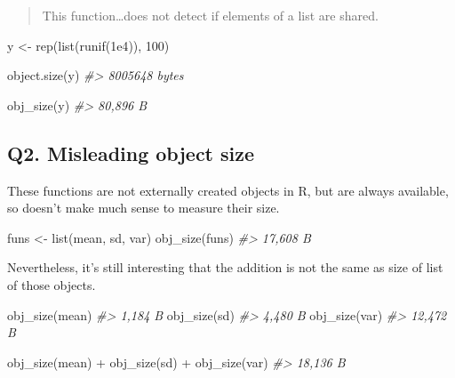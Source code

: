 \documentclass[
]{book}
\newenvironment{Shaded}{\begin{snugshade}}{\end{snugshade}}
\newcommand{\CommentTok}[1]{\textcolor[rgb]{0.56,0.35,0.01}{\textit{#1}}}
\newcommand{\DecValTok}[1]{\textcolor[rgb]{0.00,0.00,0.81}{#1}}
\newcommand{\FloatTok}[1]{\textcolor[rgb]{0.00,0.00,0.81}{#1}}
\newcommand{\FunctionTok}[1]{\textcolor[rgb]{0.00,0.00,0.00}{#1}}
\newcommand{\NormalTok}[1]{#1}
\newcommand{\OtherTok}[1]{\textcolor[rgb]{0.56,0.35,0.01}{#1}}
\newcommand{\SpecialCharTok}[1]{\textcolor[rgb]{0.00,0.00,0.00}{#1}}
\begin{document}
\begin{quote}
This function\ldots does not detect if elements of a list are shared.
\end{quote}

\begin{Shaded}
\begin{Highlighting}[]
\NormalTok{y }\OtherTok{\textless{}{-}} \FunctionTok{rep}\NormalTok{(}\FunctionTok{list}\NormalTok{(}\FunctionTok{runif}\NormalTok{(}\FloatTok{1e4}\NormalTok{)), }\DecValTok{100}\NormalTok{)}

\FunctionTok{object.size}\NormalTok{(y)}
\CommentTok{\#\textgreater{} 8005648 bytes}

\FunctionTok{obj\_size}\NormalTok{(y)}
\CommentTok{\#\textgreater{} 80,896 B}
\end{Highlighting}
\end{Shaded}

\hypertarget{q2.-misleading-object-size}{%
\subsection*{Q2. Misleading object size}\label{q2.-misleading-object-size}}

These functions are not externally created objects in R, but are always available, so doesn't make much sense to measure their size.

\begin{Shaded}
\begin{Highlighting}[]
\NormalTok{funs }\OtherTok{\textless{}{-}} \FunctionTok{list}\NormalTok{(mean, sd, var)}
\FunctionTok{obj\_size}\NormalTok{(funs)}
\CommentTok{\#\textgreater{} 17,608 B}
\end{Highlighting}
\end{Shaded}

Nevertheless, it's still interesting that the addition is not the same as size of list of those objects.

\begin{Shaded}
\begin{Highlighting}[]
\FunctionTok{obj\_size}\NormalTok{(mean)}
\CommentTok{\#\textgreater{} 1,184 B}
\FunctionTok{obj\_size}\NormalTok{(sd)}
\CommentTok{\#\textgreater{} 4,480 B}
\FunctionTok{obj\_size}\NormalTok{(var)}
\CommentTok{\#\textgreater{} 12,472 B}

\FunctionTok{obj\_size}\NormalTok{(mean) }\SpecialCharTok{+} \FunctionTok{obj\_size}\NormalTok{(sd) }\SpecialCharTok{+} \FunctionTok{obj\_size}\NormalTok{(var)}
\CommentTok{\#\textgreater{} 18,136 B}
\end{Highlighting}
\end{Shaded}
\end{document}
